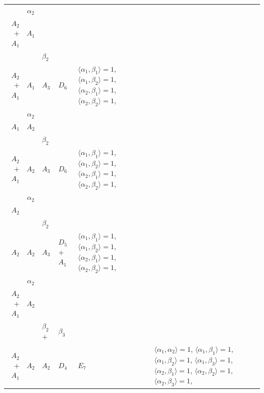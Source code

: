 \documentclass[12pt]{report}
\begin{document}
\begin{appendix}
{\begin{longtable}{rcl p{1cm}p{1cm}p{3cm} }
\begin{tabular}{cc}$\alpha_1$+ & $\alpha_2$\\\tiny{ $A_2$+$A_1$ } & \tiny{ $A_1$ }\end{tabular} &\begin{tabular}{c} = \\~ \end{tabular} & \begin{tabular}{cc}$\beta_1$+ & $\beta_2$\\\tiny{ $A_2$+$A_1$ } & \tiny{ $A_1$ }\end{tabular} & $A_3$ & $D_6$ &  $\langle\alpha_1, \beta_1\rangle=1$, $\langle\alpha_1, \beta_2\rangle=1$, $\langle\alpha_2, \beta_1\rangle=1$, $\langle\alpha_2, \beta_2\rangle=1$, 
\\
\begin{tabular}{cc}$\alpha_1$+ & $\alpha_2$\\\tiny{ $A_1$ } & \tiny{ $A_2$ }\end{tabular} &\begin{tabular}{c} = \\~ \end{tabular} & \begin{tabular}{cc}$\beta_1$+ & $\beta_2$\\\tiny{ $A_2$+$A_1$ } & \tiny{ $A_2$ }\end{tabular} & $A_3$ & $D_6$ &  $\langle\alpha_1, \beta_1\rangle=1$, $\langle\alpha_1, \beta_2\rangle=1$, $\langle\alpha_2, \beta_1\rangle=1$, $\langle\alpha_2, \beta_2\rangle=1$, 
\\
\begin{tabular}{cc}$\alpha_1$+ & $\alpha_2$\\\tiny{ $A_2$ } & \tiny{  }\end{tabular} &\begin{tabular}{c} = \\~ \end{tabular} & \begin{tabular}{cc}$\beta_1$+ & $\beta_2$\\\tiny{ $A_2$ } & \tiny{ $A_2$ }\end{tabular} & $A_3$ & $D_5$+$A_1$ &  $\langle\alpha_1, \beta_1\rangle=1$, $\langle\alpha_1, \beta_2\rangle=1$, $\langle\alpha_2, \beta_1\rangle=1$, $\langle\alpha_2, \beta_2\rangle=1$, 
\\
\begin{tabular}{cc}$\alpha_1$+ & $\alpha_2$\\\tiny{ $A_2$+$A_1$ } & \tiny{ $A_2$ }\end{tabular} &\begin{tabular}{c} = \\~ \end{tabular} & \begin{tabular}{ccc}$\beta_1$+ & $\beta_2$+ & $\beta_3$\\\tiny{ $A_2$+$A_1$ } & \tiny{ $A_2$ } & \tiny{ $A_2$ }\end{tabular} & $D_4$ & $E_7$ & $\langle\alpha_1, \alpha_2\rangle=1$,  $\langle\alpha_1, \beta_1\rangle=1$, $\langle\alpha_1, \beta_2\rangle=1$, $\langle\alpha_1, \beta_3\rangle=1$, $\langle\alpha_2, \beta_1\rangle=1$, $\langle\alpha_2, \beta_2\rangle=1$, $\langle\alpha_2, \beta_3\rangle=1$, 

\end{longtable}}
\end{appendix}
\end{document}

